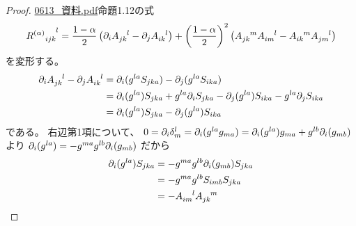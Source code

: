 \documentclass[report]{jlreq}
\begin{document}
\begin{proof}
    \url{0613_資料.pdf}命題1.12の式
    \begin{equation}
        {R^{(\alpha)}}_{ijk}^{\hphantom{ijk}l}
            = \frac{1 - \alpha}{2} \left({
                \partial_i A_{jk}^{\hphantom{jk}l}
                -
                \partial_j A_{ik}^{\hphantom{ik}l}
            }\right)
            + \left({\frac{1 - \alpha}{2}}\right)^2
            \left({
                A_{jk}^{\hphantom{jk}m} A_{im}^{\hphantom{im}l}
                -
                A_{ik}^{\hphantom{ik}m} A_{jm}^{\hphantom{jm}l}
            }\right)
    \end{equation}
    を変形する。
    \begin{alignat}{1}
        \partial_i A_{jk}^{\hphantom{jk}l}
        -
        \partial_j A_{ik}^{\hphantom{ik}l}
            &=
                \partial_i (
                    g^{la} S_{jka}
                )
                -
                \partial_j (
                    g^{la} S_{ika}
                )
                \\
            &=
                \partial_i (g^{la})
                S_{jka}
                +
                g^{la}
                \partial_i S_{jka}
                -
                \partial_j (g^{la})
                S_{ika}
                -
                g^{la}
                \partial_j S_{ika}
                \\
            &=
                \partial_i (g^{la})
                S_{jka}
                -
                \partial_j (g^{la})
                S_{ika}
    \end{alignat}
    である。
    右辺第1項について、
    $0
        =
            \partial_i \delta_m^l
        =
            \partial_i (g^{la} g_{ma})
        =
            \partial_i (g^{la}) g_{ma}
            +
            g^{lb} \partial_i (g_{mb})$
    より
    $\partial_i (g^{la})
        =
            - g^{ma} g^{lb} \partial_i (g_{mb})$
    だから
    \begin{alignat}{1}
        \partial_i (g^{la})
            S_{jka}
            &=
                -
                g^{ma}
                g^{lb}
                \partial_i (g_{mb})
                S_{jka}
                \\
            &=
                -
                g^{ma}
                g^{lb}
                S_{imb}
                S_{jka}
                \\
            &=
                -
                A_{im}^{\hphantom{im}l}
                A_{jk}^{\hphantom{jk}m}
    \end{alignat}

\end{proof}
\end{document}
